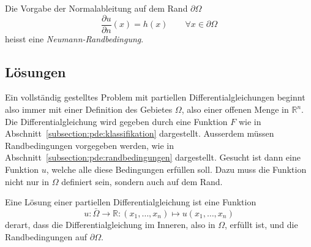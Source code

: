 \begin{definition}
Die Vorgabe der Normalableitung auf dem Rand $\partial\Omega$
\[
\frac{\partial u}{\partial n}(x) = h(x)\qquad \forall x\in\partial\Omega
\]
heisst eine {\em Neumann-Randbedingung}.
\end{definition}

\subsection{Lösungen
\label{subsection:pde:loesungen}}
Ein vollständig gestelltes Problem mit partiellen Differentialgleichungen
beginnt also immer mit einer Definition des Gebietes $\Omega$, also
einer offenen Menge in $\mathbb R^n$.
Die Differentialgleichung wird gegeben durch eine Funktion $F$ wie in
Abschnitt~\ref{subsection:pde:klassifikation} dargestellt.
Ausserdem müssen Randbedingungen vorgegeben werden, wie in
Abschnitt~\ref{subsection:pde:randbedingungen} dargestellt.
Gesucht ist dann eine Funktion $u$, welche alle diese Bedingungen
erfüllen soll.
Dazu muss die Funktion nicht nur in $\Omega$ definiert sein, 
sondern auch auf dem Rand.

\begin{definition}
Eine Lösung einer partiellen Differentialgleichung ist eine Funktion
\[
u\colon \bar{\Omega} \to \mathbb R:(x_1,\dots,x_n)\mapsto u(x_1,\dots,x_n)
\]
derart, dass die Differentialgleichung im Inneren, also in $\Omega$,
erfüllt ist, und die Randbedingungen auf $\partial\Omega$.
\end{definition}






